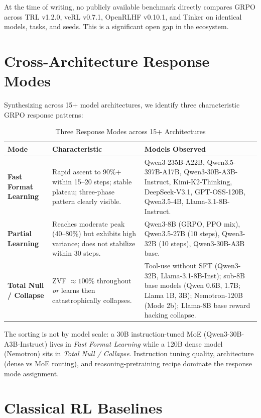 \documentclass[12pt,a4paper]{report}
\theoremstyle{definition}
\begin{document}
At the time of writing, no publicly available benchmark directly compares GRPO across TRL v1.2.0,
veRL v0.7.1, OpenRLHF v0.10.1, and Tinker on identical models, tasks, and seeds. This is a significant
open gap in the ecosystem.

\section{Cross-Architecture Response Modes}
\label{sec:response-modes}

Synthesizing across 15+ model architectures, we identify three characteristic GRPO response patterns:

\begin{table}[htbp]
\centering
\caption{Three Response Modes across 15+ Architectures}
\label{tab:response-modes}
\footnotesize
\begin{tabular}{lp{4.5cm}p{6cm}}
\toprule
\textbf{Mode} & \textbf{Characteristic} & \textbf{Models Observed} \\
\midrule
\textbf{Fast Format Learning} &
Rapid ascent to 90\%+ within 15--20 steps; stable plateau; three-phase pattern clearly visible. &
Qwen3-235B-A22B, Qwen3.5-397B-A17B, Qwen3-30B-A3B-Instruct, Kimi-K2-Thinking, DeepSeek-V3.1,
GPT-OSS-120B, Qwen3.5-4B, Llama-3.1-8B-Instruct. \\
\addlinespace
\textbf{Partial Learning} &
Reaches moderate peak (40--80\%) but exhibits high variance; does not stabilize within 30 steps. &
Qwen3-8B (GRPO, PPO mix), Qwen3.5-27B (10 steps), Qwen3-32B (10 steps), Qwen3-30B-A3B base. \\
\addlinespace
\textbf{Total Null / Collapse} &
ZVF $\approx 100\%$ throughout \emph{or} learns then catastrophically collapses. &
Tool-use without SFT (Qwen3-32B, Llama-3.1-8B-Inst); sub-8B base models (Qwen 0.6B, 1.7B;
Llama 1B, 3B); Nemotron-120B (Mode 2b); Llama-8B base reward hacking collapse. \\
\bottomrule
\end{tabular}
\end{table}

The sorting is not by model scale: a 30B instruction-tuned MoE (Qwen3-30B-A3B-Instruct) lives in
\emph{Fast Format Learning} while a 120B dense model (Nemotron) sits in \emph{Total Null / Collapse}.
Instruction tuning quality, architecture (dense vs MoE routing), and reasoning-pretraining recipe
dominate the response mode assignment.


\section{Classical RL Baselines}
\label{sec:classical-baselines}
\end{document}
